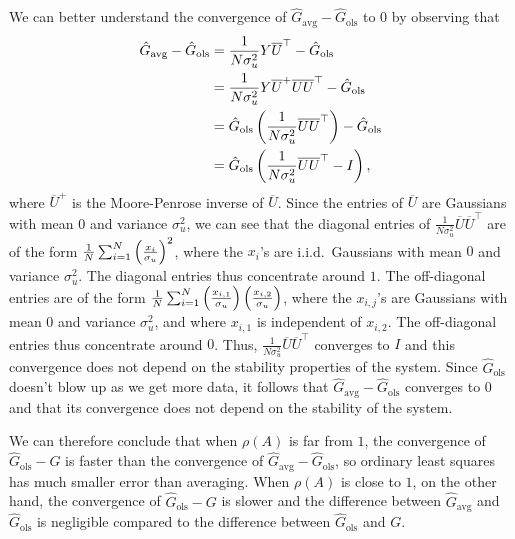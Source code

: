 We can better understand the convergence of
$\hat G_{\text{avg}} - \hat G_{\text{ols}}$ to $0$ by observing that
\begin{align*}
\hat G_{\text{avg}} - \hat G_{\text{ols}}
&= \frac{1}{N \sigma_u^2} Y \overline{U}^\top - \hat G_{\text{ols}} \\
&= \frac{1}{N \sigma_u^2} Y \overline{U}^+ \overline{U} \overline{U}^\top - \hat G_{\text{ols}} \\
&= \hat G_{\text{ols}} \left({\frac{1}{N \sigma_u^2} \overline{U} \overline{U}^\top}\right) - \hat G_{\text{ols}} \\
&= \hat G_{\text{ols}} \left({\frac{1}{N \sigma_u^2} \overline{U} \overline{U}^\top - I}\right), \\
\end{align*}
where $\overline{U}^+$ is the Moore-Penrose inverse of $\overline{U}$.
Since the entries of $\overline{U}$ are Gaussians
with mean $0$ and variance $\sigma_u^2$,
we can see that the diagonal entries of
$\frac{1}{N \sigma_u^2} \overline{U} \overline{U}^\top$
are of the form $\frac{1}{N} \sum _{i=1} ^N \left({\frac{x_i}{\sigma_u}}\right)^2$,
where the $x_i$'s are i.i.d.~Gaussians with mean $0$ and variance $\sigma_u^2$.
The diagonal entries thus concentrate around $1$.
The off-diagonal entries
are of the form $\frac{1}{N} \sum _{i=1} ^N \left({\frac{x_{i,1}}{\sigma_u}}\right)
\left({\frac{x_{i,2}}{\sigma_u}}\right)$,
where the $x_{i,j}$'s are Gaussians with mean $0$ and variance $\sigma_u^2$,
and where $x_{i,1}$ is independent of $x_{i,2}$.
The off-diagonal entries thus concentrate around $0$.
Thus, $\frac{1}{N \sigma_u^2} \overline{U} \overline{U}^\top$ converges to $I$
and this convergence does not depend on the stability properties of the system.
Since $\hat G_{\text{ols}}$ doesn't blow up as we get more data,
it follows that $\hat G_{\text{avg}} - \hat G_{\text{ols}}$ converges to $0$
and that its convergence does not depend on the stability of the system.

We can therefore conclude that when $\rho(A)$ is far from $1$,
the convergence of $\hat G_{\text{ols}} - G$ is faster
than the convergence of $\hat G_{\text{avg}} - \hat G_{\text{ols}}$,
so ordinary least squares has much smaller error than averaging.
When $\rho(A)$ is close to $1$, on the other hand,
the convergence of $\hat G_{\text{ols}} - G$ is slower
and the difference between
$\hat G_{\text{avg}}$ and $\hat G_{\text{ols}}$ is negligible
compared to the difference between $\hat G_{\text{ols}}$ and $G$.
